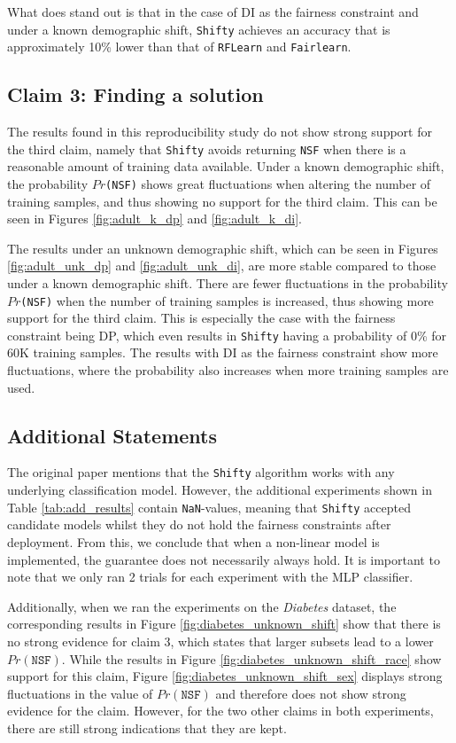 What does stand out is that in the case of DI as the fairness constraint and under a known demographic shift, \texttt{Shifty} achieves an accuracy that is approximately 10\% lower than that of \texttt{RFLearn} and \texttt{Fairlearn}.


\subsection{Claim 3: Finding a solution}
The results found in this reproducibility study do not show strong support for the third claim, namely that \texttt{Shifty} avoids returning \texttt{NSF} when there is a reasonable amount of training data available. Under a known demographic shift, the probability $Pr$\texttt{(NSF)} shows great fluctuations when altering the number of training samples, and thus showing no support for the third claim. This can be seen in Figures \ref{fig:adult_k_dp} and \ref{fig:adult_k_di}.

The results under an unknown demographic shift, which can be seen in Figures \ref{fig:adult_unk_dp} and \ref{fig:adult_unk_di}, are more stable compared to those under a known demographic shift. There are fewer fluctuations in the probability $Pr$\texttt{(NSF)} when the number of training samples is increased, thus showing more support for the third claim. This is especially the case with the fairness constraint being DP, which even results in \texttt{Shifty} having a probability of 0\% for 60K training samples. The results with DI as the fairness constraint show more fluctuations, where the probability also increases when more training samples are used.

\subsection{Additional Statements}
The original paper mentions that the \texttt{Shifty} algorithm works with any underlying classification model. However, the additional experiments shown in Table \ref{tab:add_results} contain \texttt{NaN}-values, meaning that \texttt{Shifty} accepted candidate models whilst they do not hold the fairness constraints after deployment. From this, we conclude that when a non-linear model is implemented, the guarantee does not necessarily always hold. It is important to note that we only ran 2 trials for each experiment with the MLP classifier.

Additionally, when we ran the experiments on the \textit{Diabetes} dataset, the corresponding results in Figure \ref{fig:diabetes_unknown_shift} show that there is no strong evidence for claim 3, which states that larger subsets lead to a lower $Pr(\texttt{NSF})$. While the results in Figure \ref{fig:diabetes_unknown_shift_race} show support for this claim, Figure \ref{fig:diabetes_unknown_shift_sex} displays strong fluctuations in the value of $Pr(\texttt{NSF})$ and therefore does not show strong evidence for the claim. However, for the two other claims in both experiments, there are still strong indications that they are kept.


